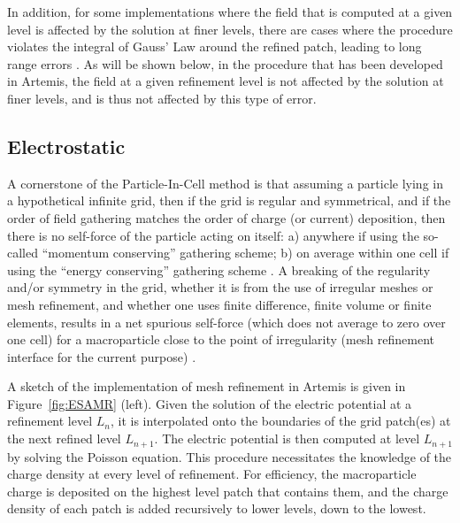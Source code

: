In addition, for some implementations where the field that is computed at a given level is affected by the solution at finer levels, there are cases where the procedure violates the integral of Gauss' Law around the refined patch, leading to long range errors \cite{Vaylpb2002,Colellajcp2010}. As will be shown below, in the procedure that has been developed in Artemis, the field at a given refinement level is not affected by the solution at finer levels, and is thus not affected by this type of error.

\subsection{Electrostatic}
A cornerstone of the Particle-In-Cell method is that assuming a particle lying in a hypothetical infinite grid, then if the grid is regular and symmetrical, and if the order of field gathering matches the order of charge (or current) deposition, then there is no self-force of the particle acting on itself: a) anywhere if using the so-called ``momentum conserving'' gathering scheme; b) on average within one cell if using the ``energy conserving'' gathering scheme \cite{Birdsalllangdon}. A breaking of the regularity and/or symmetry in the grid, whether it is from the use of irregular meshes or mesh refinement, and whether one uses finite difference, finite volume or finite elements, results in a net spurious self-force (which does not average to zero over one cell)  for a macroparticle close to the point of irregularity (mesh refinement interface for the current purpose) \cite{Vaylpb2002,Colellajcp2010}.

A sketch of the implementation of mesh refinement in Artemis is given in Figure~\ref{fig:ESAMR} (left). Given the solution of the electric potential at a refinement level $L_n$, it is interpolated onto the boundaries of the grid patch(es) at the next refined level $L_{n+1}$. The electric potential is then computed at level $L_{n+1}$ by solving the Poisson equation. This procedure necessitates the knowledge of the charge density at every level of refinement. For efficiency, the macroparticle charge is deposited on the highest level patch that contains them, and the charge density of each patch is added recursively to lower levels, down to the lowest.


